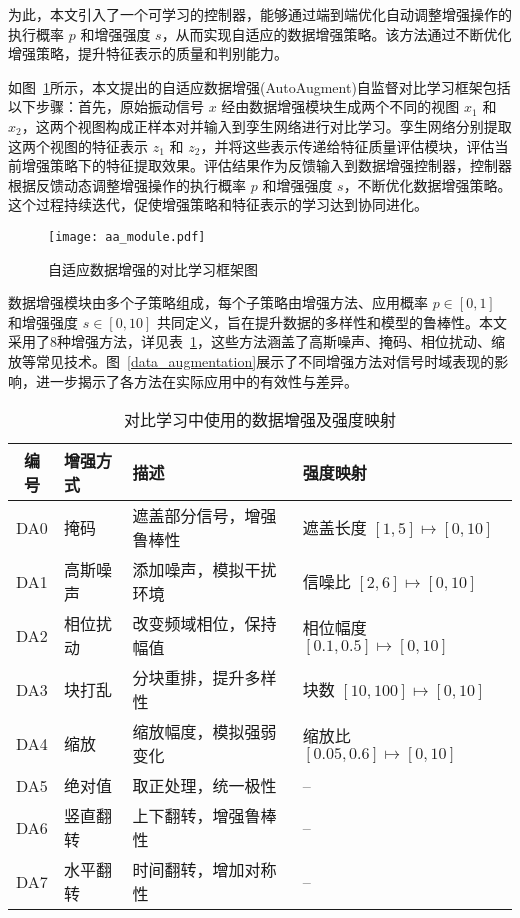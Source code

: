 \documentclass[master]{thesis-uestc}
\begin{document}
为此，本文引入了一个可学习的控制器，能够通过端到端优化自动调整增强操作的执行概率 $p$ 和增强强度 $s$，从而实现自适应的数据增强策略。该方法通过不断优化增强策略，提升特征表示的质量和判别能力。

如图~\ref{aa_module}所示，本文提出的自适应数据增强(AutoAugment)自监督对比学习框架包括以下步骤：首先，原始振动信号 $x$ 经由数据增强模块生成两个不同的视图 $x_1$ 和 $x_2$，这两个视图构成正样本对并输入到孪生网络进行对比学习。孪生网络分别提取这两个视图的特征表示 $z_1$ 和 $z_2$，并将这些表示传递给特征质量评估模块，评估当前增强策略下的特征提取效果。评估结果作为反馈输入到数据增强控制器，控制器根据反馈动态调整增强操作的执行概率 $p$ 和增强强度 $s$，不断优化数据增强策略。这个过程持续迭代，促使增强策略和特征表示的学习达到协同进化。

\begin{figure}[h]
    \centering
    \texttt{[image: aa\_module.pdf]}
    \caption{自适应数据增强的对比学习框架图}
    \label{aa_module}
\end{figure}

数据增强模块由多个子策略组成，每个子策略由增强方法、应用概率 $p \in [0,1]$ 和增强强度 $s \in [0,10]$ 共同定义，旨在提升数据的多样性和模型的鲁棒性。本文采用了8种增强方法，详见表~\ref{tab:augmentation_descriptions}，这些方法涵盖了高斯噪声、掩码、相位扰动、缩放等常见技术。图~\ref{data_augmentation}展示了不同增强方法对信号时域表现的影响，进一步揭示了各方法在实际应用中的有效性与差异。


\begin{table}[h]
    \caption{对比学习中使用的数据增强及强度映射}
    \centering
    \renewcommand\arraystretch{1.3}
    \begin{tabular}{clp{5cm}l} %
    \toprule
    编号 & 增强方式 & 描述 & 强度映射 \\
    \midrule
    DA0 & 掩码 & 遮盖部分信号，增强鲁棒性 & 遮盖长度 $[1,5] \mapsto [0,10]$ \\
    DA1 & 高斯噪声 & 添加噪声，模拟干扰环境 & 信噪比 $[2,6] \mapsto [0,10]$ \\
    DA2 & 相位扰动 & 改变频域相位，保持幅值 & 相位幅度 $[0.1,0.5] \mapsto [0,10]$ \\
    DA3 & 块打乱 & 分块重排，提升多样性 & 块数 $[10,100] \mapsto [0,10]$ \\
    DA4 & 缩放 & 缩放幅度，模拟强弱变化 & 缩放比 $[0.05,0.6] \mapsto [0,10]$ \\
    DA5 & 绝对值 & 取正处理，统一极性 & -- \\
    DA6 & 竖直翻转 & 上下翻转，增强鲁棒性 & -- \\
    DA7 & 水平翻转 & 时间翻转，增加对称性 & -- \\
    \bottomrule
    \end{tabular}
    \label{tab:augmentation_descriptions}
\end{table}
\end{document}
